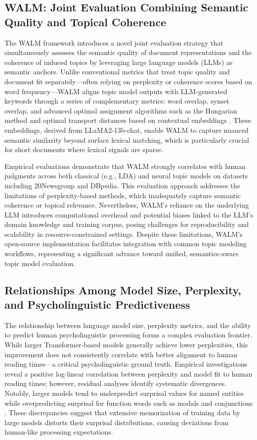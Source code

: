 \documentclass[sigconf]{acmart}
\begin{document}
\subsection{WALM: Joint Evaluation Combining Semantic Quality and Topical Coherence}

The WALM framework introduces a novel joint evaluation strategy that simultaneously assesses the semantic quality of document representations and the coherence of induced topics by leveraging large language models (LLMs) as semantic anchors. Unlike conventional metrics that treat topic quality and document fit separately—often relying on perplexity or coherence scores based on word frequency—WALM aligns topic model outputs with LLM-generated keywords through a series of complementary metrics: word overlap, synset overlap, and advanced optimal assignment algorithms such as the Hungarian method and optimal transport distances based on contextual embeddings \cite{ref47}. These embeddings, derived from LLaMA2-13b-chat, enable WALM to capture nuanced semantic similarity beyond surface lexical matching, which is particularly crucial for short documents where lexical signals are sparse.

Empirical evaluations demonstrate that WALM strongly correlates with human judgments across both classical (e.g., LDA) and neural topic models on datasets including 20Newsgroup and DBpedia. This evaluation approach addresses the limitations of perplexity-based methods, which inadequately capture semantic coherence or topical relevance. Nevertheless, WALM’s reliance on the underlying LLM introduces computational overhead and potential biases linked to the LLM’s domain knowledge and training corpus, posing challenges for reproducibility and scalability in resource-constrained settings. Despite these limitations, WALM’s open-source implementation facilitates integration with common topic modeling workflows, representing a significant advance toward unified, semantics-aware topic model evaluation.

\subsection{Relationships Among Model Size, Perplexity, and Psycholinguistic Predictiveness}

The relationship between language model size, perplexity metrics, and the ability to predict human psycholinguistic processing forms a complex evaluation frontier. While larger Transformer-based models generally achieve lower perplexities, this improvement does not consistently correlate with better alignment to human reading times—a critical psycholinguistic ground truth. Empirical investigations reveal a positive log-linear correlation between perplexity and model fit to human reading times; however, residual analyses identify systematic divergences. Notably, larger models tend to underpredict surprisal values for named entities while overpredicting surprisal for function words such as modals and conjunctions \cite{ref33,ref35}. These discrepancies suggest that extensive memorization of training data by large models distorts their surprisal distributions, causing deviations from human-like processing expectations.
\end{document}
